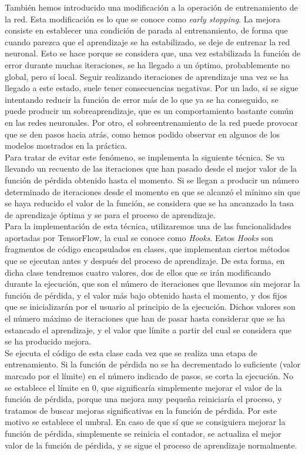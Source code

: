 \documentclass[11pt]{article}
\theoremstyle{plain}
\theoremstyle{definition}
\begin{document}
También hemos introducido una modificación a la operación de
entrenamiento de la red. Esta modificación es lo que se conoce como
\textit{early stopping}. La mejora consiste en establecer una
condición de parada al entrenamiento, de forma que cuando parezca que
el aprendizaje se ha estabilizado, se deje de entrenar la red
neuronal. Esto se hace porque se considera que, una vez estabilizada
la función de error durante muchas iteraciones, se ha llegado a un
óptimo, probablemente no global, pero sí local. Seguir realizando
iteraciones de aprendizaje una vez se ha llegado a este estado, suele
tener consecuencias negativas. Por un lado, si se sigue intentando
reducir la función de error más de lo que ya se ha conseguido, se
puede producir un sobreaprendizaje, que es un comportamiento bastante
común en las redes neuronales. Por otro, el sobreentrenamiento de la
red puede provocar que se den pasos hacia atrás, como hemos podido
observar en algunos de los modelos mostrados en la práctica.\\

Para tratar de evitar este fenómeno, se implementa la siguiente
técnica. Se va llevando un recuento de las iteraciones que han pasado
desde el mejor valor de la función de pérdida obtenido hasta el
momento. Si se llegan a producir un número determinado de iteraciones
desde el momento en que se alcanzó el mínimo sin que se haya reducido
el valor de la función, se considera que se ha ancanzado la tasa de
aprendizaje óptima y se para el proceso
de aprendizaje.\\

Para la implementación de esta técnica, utilizaremos una de las
funcionalidades aportadas por TensorFlow, la cual se conoce como
\textit{Hooks}. Estos \textit{Hooks} son fragmentos de código
encapsulados en clases, que implementan ciertos métodos que se
ejecutan antes y después del proceso de aprendizaje. De esta forma, en
dicha clase tendremos cuatro valores, dos de ellos que se irán
modificando durante la ejecución, que son el número de iteraciones que
llevamos sin mejorar la función de pérdida, y el valor más bajo
obtenido hasta el momento, y dos fijos que se inicializarán por el
usuario al principio de la ejecución. Dichos valores son el número
máximo de iteraciones que han de pasar hasta considerar que se ha
estancado el aprendizaje, y el valor que límite a partir
del cual se considera que se ha producido mejora.\\

Se ejecuta el código de esta clase cada vez que se realiza una etapa
de entrenamiento. Si la función de pérdida no se ha decrementado lo
suficiente (valor marcado por el límite) en el número indicado de
pasos, se corta la ejecución. No se establece el límite en 0, que
significaría simplemente mejorar el valor de la función de pérdida,
porque una mejora muy pequeña reiniciaría el proceso, y tratamos de
buscar mejoras significativas en la función de pérdida. Por este
motivo se establece el umbral. En caso de que sí que se consiguiera
mejorar la función de pérdida, simplemente se reinicia el contador,
se actualiza el mejor valor de la función de pérdida, y se sigue
el proceso de aprendizaje normalmente.\\
\end{document}
